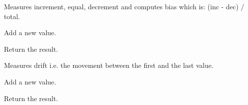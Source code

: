 \documentclass[letterpaper,10pt,english]{sphinxmanual}
\begin{document}

\begin{fulllineitems}
\label{\detokenize{ref/LIS/core/FrameSet:TotalDepth.LIS.core.FrameSet.AccBias}}
Measures increment, equal, decrement and computes bias which is:
(inc - dec) / total.

\begin{fulllineitems}
\label{\detokenize{ref/LIS/core/FrameSet:TotalDepth.LIS.core.FrameSet.AccBias.add}}
Add a new value.

\end{fulllineitems}


\begin{fulllineitems}
\label{\detokenize{ref/LIS/core/FrameSet:TotalDepth.LIS.core.FrameSet.AccBias.value}}
Return the result.

\end{fulllineitems}


\end{fulllineitems}


\begin{fulllineitems}
\label{\detokenize{ref/LIS/core/FrameSet:TotalDepth.LIS.core.FrameSet.AccDrift}}
Measures drift i.e. the movement between the first and the last value.

\begin{fulllineitems}
\label{\detokenize{ref/LIS/core/FrameSet:TotalDepth.LIS.core.FrameSet.AccDrift.add}}
Add a new value.

\end{fulllineitems}


\begin{fulllineitems}
\label{\detokenize{ref/LIS/core/FrameSet:TotalDepth.LIS.core.FrameSet.AccDrift.value}}
Return the result.

\end{fulllineitems}


\end{fulllineitems}
\end{document}
